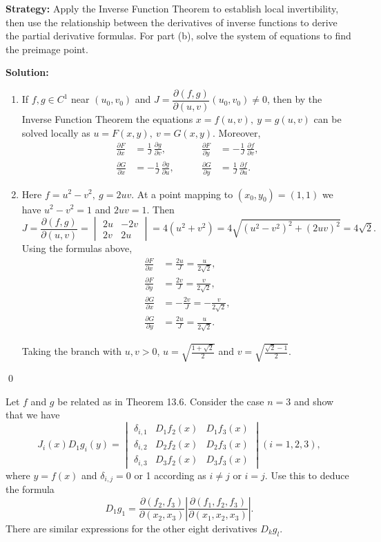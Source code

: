 \noindent\textbf{Strategy:} Apply the Inverse Function Theorem to establish local invertibility, then use the relationship between the derivatives of inverse functions to derive the partial derivative formulas. For part (b), solve the system of equations to find the preimage point.

\bigskip\noindent\textbf{Solution:}
\begin{enumerate}[label=(\alph*)]
    \item If $f,g\in C^1$ near $(u_0,v_0)$ and $J=\dfrac{\partial(f,g)}{\partial(u,v)}(u_0,v_0)\neq 0$, then by the Inverse Function Theorem the equations $x=f(u,v),\ y=g(u,v)$ can be solved locally as $u=F(x,y),\ v=G(x,y)$. Moreover,
    \[
    \begin{aligned}
    \frac{\partial F}{\partial x}&=\frac{1}{J}\,\frac{\partial g}{\partial v},&\qquad \frac{\partial F}{\partial y}&=-\frac{1}{J}\,\frac{\partial f}{\partial v},\\
    \frac{\partial G}{\partial x}&=-\frac{1}{J}\,\frac{\partial g}{\partial u},&\qquad \frac{\partial G}{\partial y}&=\frac{1}{J}\,\frac{\partial f}{\partial u}.
    \end{aligned}
    \]
    \item Here $f=u^2-v^2,\ g=2uv$. At a point mapping to $(x_0,y_0)=(1,1)$ we have $u^2-v^2=1$ and $2uv=1$. Then
    \[J=\frac{\partial(f,g)}{\partial(u,v)}=\begin{vmatrix}2u&-2v\\2v&2u\end{vmatrix}=4(u^2+v^2)=4\sqrt{(u^2-v^2)^2+(2uv)^2}=4\sqrt{2}.
    \]
    Using the formulas above,
    \begin{align*}
    \frac{\partial F}{\partial x}&=\frac{2u}{J}=\frac{u}{2\sqrt2},\\
    \frac{\partial F}{\partial y}&=\frac{2v}{J}=\frac{v}{2\sqrt2},\\
    \frac{\partial G}{\partial x}&=-\frac{2v}{J}=-\frac{v}{2\sqrt2},\\
    \frac{\partial G}{\partial y}&=\frac{2u}{J}=\frac{u}{2\sqrt2}.
    \end{align*}
    
    Taking the branch with $u,v>0$, $u=\sqrt{\tfrac{1+\sqrt2}{2}}$ and $v=\sqrt{\tfrac{\sqrt2-1}{2}}$.
\end{enumerate}\qed


\begin{problembox}
Let \( f \) and \( g \) be related as in Theorem 13.6. Consider the case \( n = 3 \) and show that we have
\[J_i(x)D_1g_i(y) =
\begin{vmatrix}
\delta_{i,1} & D_1f_2(x) & D_1f_3(x)\\
\delta_{i,2} & D_2f_2(x) & D_2f_3(x)\\
\delta_{i,3} & D_3f_2(x) & D_3f_3(x)
\end{vmatrix}
(i = 1, 2, 3),\]
where \( y = f(x) \) and \( \delta_{i,j} = 0 \) or 1 according as \( i \neq j \) or \( i = j \). Use this to deduce the formula
\[D_1g_1 = \frac{\partial (f_2, f_3)}{\partial (x_2, x_3)} \left| \frac{\partial (f_1, f_2, f_3)}{\partial (x_1, x_2, x_3)} \right|.\]
There are similar expressions for the other eight derivatives \( D_kg_l \).
\end{problembox}

